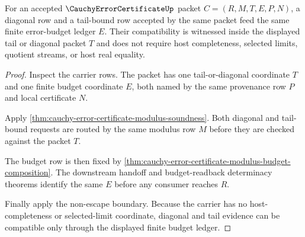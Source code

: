 \begin{theorem}
\label{thm:cauchy-error-certificate-diagonal-tail-compatibility}
For an accepted $\CauchyErrorCertificateUp$ packet $C=(R,M,T,E,P,N)$, a diagonal row and a tail-bound row accepted by the same packet feed the same finite error-budget ledger $E$. Their compatibility is witnessed inside the displayed tail or diagonal packet $T$ and does not require host completeness, selected limits, quotient streams, or host real equality.
\end{theorem}
\begin{proof}
Inspect the carrier rows. The packet has one tail-or-diagonal coordinate $T$ and one finite budget coordinate $E$, both named by the same provenance row $P$ and local certificate $N$.

Apply \autoref{thm:cauchy-error-certificate-modulus-soundness}. Both diagonal and tail-bound requests are routed by the same modulus row $M$ before they are checked against the packet $T$.

The budget row is then fixed by \autoref{thm:cauchy-error-certificate-modulus-budget-composition}. The downstream handoff and budget-readback determinacy theorems identify the same $E$ before any consumer reaches $R$.

Finally apply the non-escape boundary. Because the carrier has no host-completeness or selected-limit coordinate, diagonal and tail evidence can be compatible only through the displayed finite budget ledger.
\end{proof}

